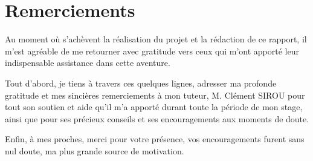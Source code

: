 \chapter*{Remerciements}
Au moment où s'achèvent la réalisation du projet et la rédaction de ce rapport, 
il m'est agréable de me retourner avec gratitude vers ceux qui  m'ont apporté leur 
indispensable assistance dans cette aventure.
\medskip

Tout d'abord, je tiens à travers ces quelques lignes, adresser ma profonde gratitude 
et mes sincières remerciements à mon tuteur, M. Clément SIROU pour tout son soutien et aide 
qu'il m'a apporté durant toute la période de mon stage, ainsi que pour ses précieux 
conseils et ses encouragements aux moments de doute.
\medskip

Enfin, à mes proches, merci pour votre présence, vos encouragements furent sans nul doute, 
ma plus grande source de motivation.
